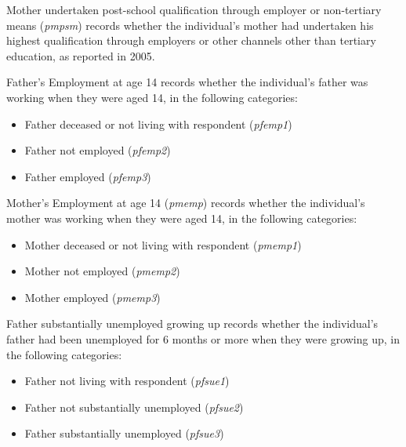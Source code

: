 \documentclass[12pt, a4paper]{article}
\begin{document}
Mother undertaken post-school qualification through employer or non-tertiary means (\textit{p\textunderscore{}mpsm}) records whether the individual’s mother had undertaken his highest qualification through employers or other channels other than tertiary education, as reported in 2005. 

Father’s Employment at age 14 records whether the individual’s father was working when they were aged 14, in the following categories:
\begin{itemize}
  \item Father deceased or not living with respondent (\textit{p\textunderscore{}femp1})
  \item Father not employed (\textit{p\textunderscore{}femp2})
  \item Father employed (\textit{p\textunderscore{}femp3})
\end{itemize}  
 
Mother’s Employment at age 14 (\textit{p\textunderscore{}memp}) records whether the individual’s mother was working when they were aged 14, in the following categories:
\begin{itemize}
  \item Mother deceased or not living with respondent (\textit{p\textunderscore{}memp1})
  \item Mother not employed (\textit{p\textunderscore{}memp2})
  \item Mother employed (\textit{p\textunderscore{}memp3})
\end{itemize}  
 
Father substantially unemployed growing up records whether the individual’s father had been unemployed for 6 months or more when they were growing up, in the following categories:
\begin{itemize}
  \item Father not living with respondent (\textit{p\textunderscore{}fsue1})
  \item Father not substantially unemployed (\textit{p\textunderscore{}fsue2})
  \item Father substantially unemployed (\textit{p\textunderscore{}fsue3})
\end{itemize} 
\end{document}
